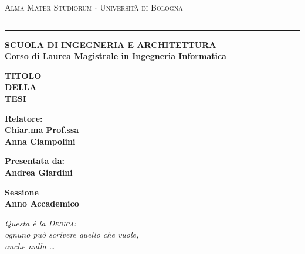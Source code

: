 \documentclass[12pt,a4paper,openright]{report}
\begin{document}
\begin{titlepage}
    \begin{center}
        {{\Large{\textsc{Alma Mater Studiorum $\cdot$ Universit\`a di
        Bologna}}}} \rule[0.1cm]{15.8cm}{0.1mm}
        \rule[0.5cm]{15.8cm}{0.6mm}
        {\small{\bf SCUOLA DI INGEGNERIA E ARCHITETTURA\\
        Corso di Laurea Magistrale in Ingegneria Informatica }}
        \end{center}
        \vspace{15mm}
        \begin{center}
        {\LARGE{\bf TITOLO}}\\
        \vspace{3mm}
        {\LARGE{\bf DELLA}}\\
        \vspace{3mm}
        {\LARGE{\bf TESI}}\\
        \end{center}
        \vspace{40mm}
        \par
        \noindent
        \begin{minipage}[t]{0.47\textwidth}
        {\large{\bf Relatore:\\
        Chiar.ma Prof.ssa\\
        Anna Ciampolini}}
        \end{minipage}
        \hfill
        \begin{minipage}[t]{0.47\textwidth}\raggedleft
        {\large{\bf Presentata da:\\
        Andrea Giardini}}
        \end{minipage}
        \vspace{20mm}
        \begin{center}
        {\large{\bf Sessione\\%
        Anno Accademico }}%
    \end{center}
\end{titlepage}

\begin{titlepage}
    \thispagestyle{empty}
    \topmargin=6.5cm
    \raggedleft
    \large
    \em
    Questa \`e la \textsc{Dedica}:\\
    ognuno pu\`o scrivere quello che vuole, \\
    anche nulla \ldots
    \newpage
    \clearpage{\pagestyle{empty}\cleardoublepage}
\end{titlepage}
\end{document}
